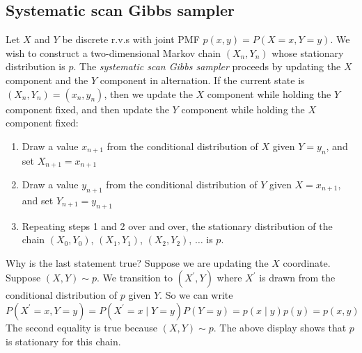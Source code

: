 \documentclass[11pt]{elegantbook}
\begin{document}
\subsection{ Systematic scan Gibbs sampler}
Let $X$ and $Y$ be discrete r.v.s with joint PMF $p(x,y) = P(X = x, Y = y)$. We wish to construct a two-dimensional Markov chain $(X_n,Y_n)$ whose stationary distribution is $p$.
The \textit{systematic scan Gibbs sampler} proceeds by updating the $X$ component and the $Y$ component in alternation. If the current state is $\left(X_n, Y_n\right)=\left(x_n, y_n\right)$, then we update the $X$ component while holding the $Y$ component fixed, and then update the $Y$ component while holding the $X$ component fixed:
\begin{enumerate}
    \item Draw a value $x_{n+1}$ from the conditional distribution of $X$ given $Y=y_n$, and set $X_{n+1}=x_{n+1}$
    \item Draw a value $y_{n+1}$ from the conditional distribution of $Y$ given $X=x_{n+1}$, and set $Y_{n+1}=y_{n+1}$
    \item Repeating steps 1 and 2 over and over, the stationary distribution of the chain $\left(X_0, Y_0\right)$, $\left(X_1, Y_1\right)$, $\left(X_2, Y_2\right)$, $\ldots$ is $p$.
\end{enumerate}

Why is the last statement true? Suppose we are updating the $X$ coordinate. Suppose $(X, Y) \sim p$. We transition to $\left(X^{\prime}, Y\right)$ where $X^{\prime}$ is drawn from the conditional distribution of $p$ given $Y$. So we can write
$$
P\left(X^{\prime}=x, Y=y\right)=P\left(X^{\prime}=x \mid Y=y\right) P(Y=y)=p(x \mid y) p(y)=p(x, y)
$$
The second equality is true because $(X, Y) \sim p$. The above display shows that $p$ is stationary for this chain.
\end{document}
